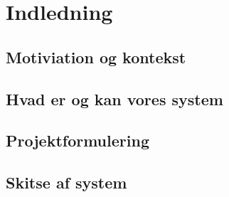 \documentclass[Rapport/Rapport_main.tex]{subfiles}
\begin{document}
\section{Indledning}
\subsection{Motiviation og kontekst}
\subsection{Hvad er og kan vores system} 
\subsection{Projektformulering}
\subsection{Skitse af system}
\end{document}
